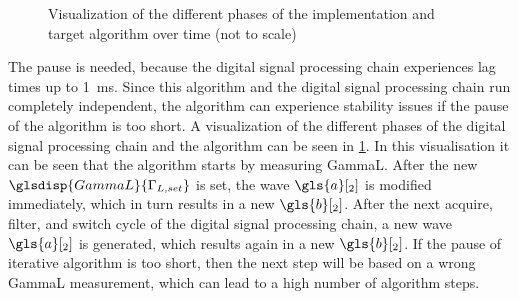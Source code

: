 \documentclass[12pt,a4paper,parskip=full,abstract=true,BCOR=12mm]{scrreprt}
\begin{document}
\begin{figure}[htb]
    \caption[Visualization of the different phases of the  implementation and target algorithm over time]{Visualization of the different phases of the  implementation and target algorithm over time (not to scale)}
    \label{fig:phases}
\end{figure}

The pause is needed, because the digital signal processing chain experiences
lag times up to \SI{1}{\milli\second}. Since this algorithm and the digital
signal processing chain run completely independent, the algorithm can
experience stability issues if the pause of the algorithm is too short. A
visualization of the different phases of the digital signal processing chain
and the algorithm can be seen in \cref{fig:phases}. In this visualisation it
can be seen that the algorithm starts by
measuring \gls{GammaL}. After the new $\glsdisp{GammaL}{\Gamma_{L,set}}$ is
set, the wave $\gls{a}[_2]$ is modified immediately, which in turn results in
a new $\gls{b}[_2]$. After the next acquire, filter, and switch cycle of the
digital signal processing chain, a new wave $\gls{a}[_2]$ is generated, which
results again in a new $\gls{b}[_2]$. If the pause of iterative algorithm
is too short, then the next step will be based on a wrong \gls{GammaL}
measurement, which can lead to a high number of algorithm steps.
\end{document}
